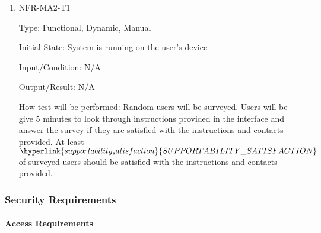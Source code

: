\documentclass[12pt, titlepage]{article}
\begin{document}
\begin{enumerate}

\item{NFR-MA2-T1}

Type: Functional, Dynamic, Manual
					
Initial State: System is running on the user's device
					
Input/Condition: N/A
					
Output/Result: N/A
					
How test will be performed: Random users will be surveyed. Users will be give 5
minutes to look through instructions provided in the interface and answer the
survey if they are satisfied with the instructions and contacts provided. At
least\\ $\hyperlink{supportability_satisfaction}{SUPPORTABILITY\_SATISFACTION}$
of surveyed users should be satisfied with the instructions and contacts
provided. \color{red}{At least 5 users will be surveyed. At least 80\% of users
surveyed should be satisfied with the instructions given.}
					
\end{enumerate}

\subsubsection{Security Requirements}
\label{sec:5.2.6}
\paragraph{Access Requirements}
\end{document}
